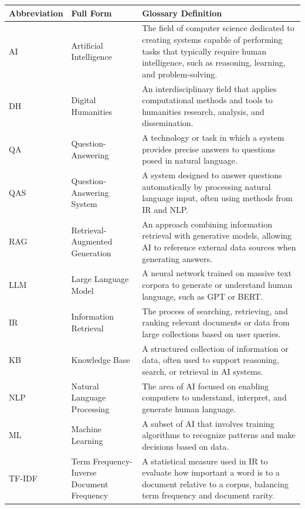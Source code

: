 \documentclass[a4paper,12pt, openany]{book}  %
\begin{document}
\begin{appendices}
\begin{table}[H]
\centering
\footnotesize
\begin{tabularx}{\textwidth}{ l l >{\justifying\arraybackslash}X }
\toprule
\textbf{Abbreviation} & \textbf{Full Form} & \textbf{Glossary Definition} \\
\midrule
AI    & Artificial Intelligence & The field of computer science dedicated to creating systems capable of performing tasks that typically require human intelligence, such as reasoning, learning, and problem-solving. \\
\cmidrule(lr){1-2}
DH    & Digital Humanities & An interdisciplinary field that applies computational methods and tools to humanities research, analysis, and dissemination. \\
\cmidrule(lr){1-2}
QA    & Question-Answering & A technology or task in which a system provides precise answers to questions posed in natural language. \\
\cmidrule(lr){1-2}
QAS   & Question-Answering System & A system designed to answer questions automatically by processing natural language input, often using methods from IR and NLP. \\
\cmidrule(lr){1-2}
RAG   & Retrieval-Augmented Generation & An approach combining information retrieval with generative models, allowing AI to reference external data sources when generating answers. \\
\cmidrule(lr){1-2}
LLM   & Large Language Model & A neural network trained on massive text corpora to generate or understand human language, such as GPT or BERT. \\
\cmidrule(lr){1-2}
IR    & Information Retrieval & The process of searching, retrieving, and ranking relevant documents or data from large collections based on user queries. \\
\cmidrule(lr){1-2}
KB    & Knowledge Base & A structured collection of information or data, often used to support reasoning, search, or retrieval in AI systems. \\
\cmidrule(lr){1-2}
NLP   & Natural Language Processing & The area of AI focused on enabling computers to understand, interpret, and generate human language. \\
\cmidrule(lr){1-2}
ML    & Machine Learning & A subset of AI that involves training algorithms to recognize patterns and make decisions based on data. \\
\cmidrule(lr){1-2}
TF-IDF & Term Frequency-Inverse Document Frequency & A statistical measure used in IR to evaluate how important a word is to a document relative to a corpus, balancing term frequency and document rarity. \\

\end{tabularx}
\end{table}
\end{appendices}
\end{document}
